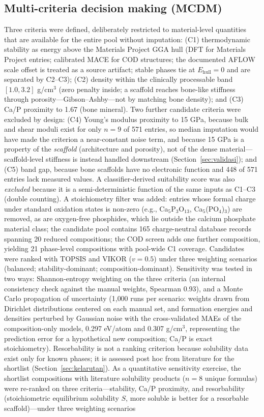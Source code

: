 \documentclass[review,11pt,a4paper]{elsarticle}
\begin{document}
\subsection{Multi-criteria decision making (MCDM)}
Three criteria were defined, deliberately restricted to material-level quantities that are available for the entire pool without imputation: (C1) thermodynamic stability as energy above the Materials Project GGA hull (DFT for Materials Project entries; calibrated MACE for COD structures; the documented AFLOW scale offset is treated as a source artifact; stable phases tie at $E_\mathrm{hull}=0$ and are separated by C2--C3); (C2) density within the clinically processable band $[1.0, 3.2]$ g/cm$^3$ (zero penalty inside; a scaffold reaches bone-like stiffness through porosity---Gibson--Ashby---not by matching bone density); and (C3) Ca/P proximity to 1.67 (bone mineral). Two further candidate criteria were excluded by design: (C4) Young's modulus proximity to 15 GPa, because bulk and shear moduli exist for only $n=9$ of 571 entries, so median imputation would have made the criterion a near-constant noise term, and because 15 GPa is a property of the \emph{scaffold} (architecture and porosity), not of the dense material---scaffold-level stiffness is instead handled downstream (Section~\ref{sec:validasi}); and (C5) band gap, because bone scaffolds have no electronic function and 448 of 571 entries lack measured values. A classifier-derived suitability score was also \emph{excluded} because it is a semi-deterministic function of the same inputs as C1--C3 (double counting). A stoichiometry filter was added: entries whose formal charge under standard oxidation states is non-zero (e.g., Ca$_5$P$_3$O$_{13}$, Ca$_5$(PO$_4$)$_3$) are removed, as are oxygen-free phosphides, which lie outside the calcium phosphate material class; the candidate pool contains 165 charge-neutral database records spanning 20 reduced compositions; the COD screen adds one further composition, yielding 21 phase-level compositions with pool-wide C1 coverage. Candidates were ranked with TOPSIS and VIKOR ($v=0.5$) under three weighting scenarios (balanced; stability-dominant; composition-dominant). Sensitivity was tested in two ways: Shannon-entropy weighting on the three criteria (an internal consistency check against the manual weights, Spearman 0.93), and a Monte Carlo propagation of uncertainty (1{,}000 runs per scenario: weights drawn from Dirichlet distributions centered on each manual set, and formation energies and densities perturbed by Gaussian noise with the cross-validated MAEs of the composition-only models, 0.297 eV/atom and 0.307 g/cm$^3$, representing the prediction error for a hypothetical new composition; Ca/P is exact stoichiometry). Resorbability is not a ranking criterion because solubility data exist only for known phases; it is assessed post hoc from literature for the shortlist (Section~\ref{sec:kelarutan}). As a quantitative sensitivity exercise, the shortlist compositions with literature solubility products ($n=8$ unique formulas) were re-ranked on three criteria---stability, Ca/P proximity, and resorbability (stoichiometric equilibrium solubility $S$, more soluble is better for a resorbable scaffold)---under three weighting scenarios 
\end{document}
